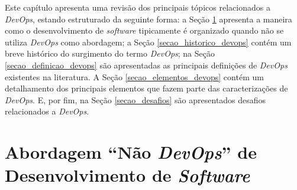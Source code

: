 \newcommand{\texCommand}[1]{\texttt{\textbackslash{#1}}}%

\newcommand{\exemplo}[1]{%
\vspace{\baselineskip}%
\noindent\fbox{\begin{minipage}{\textwidth}#1\end{minipage}}%
\\\vspace{\baselineskip}}%

\newcommand{\exemploVerbatim}[1]{%
\vspace{\baselineskip}%
\noindent\fbox{\begin{minipage}{\textwidth}%
#1\end{minipage}}%
\\\vspace{\baselineskip}}%

Este capítulo apresenta uma revisão dos principais tópicos relacionados a
\textit{DevOps}, estando estruturado da seguinte forma: a Seção \ref{secao_abordagem_nao_devops}
apresenta a maneira como o desenvolvimento de \textit{software} tipicamente é
organizado quando não se utiliza \textit{DevOps} como abordagem; a Seção \ref{secao_historico_devops}
contém um breve histórico do surgimento do termo \textit{DevOps}; na Seção
\ref{secao_definicao_devops} são apresentadas as principais definições de
\textit{DevOps} existentes na literatura. A Seção \ref{secao_elementos_devops}
contém um detalhamento dos principais elementos que fazem parte das caracterizações
de \textit{DevOps}. E, por fim, na Seção \ref{secao_desafios} são apresentados
desafios relacionados a \textit{DevOps}.

\section{Abordagem ``Não \textit{DevOps}'' de Desenvolvimento de \textit{Software}}
\label{secao_abordagem_nao_devops}


